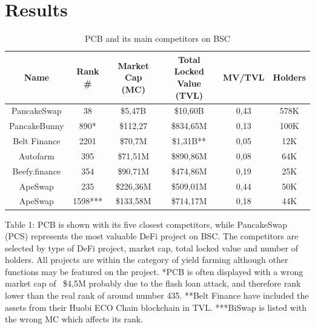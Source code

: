 \documentclass[12pt]{article}
\begin{document}
\section*{Results}
\begin{table}[ht]
\caption{PCB and its main competitors on BSC}
\begin{tabular}{||c c c c c c||} 
 \hline
 Name & Rank \# &  Market Cap (MC) & Total Locked Value (TVL) & MV/TVL & Holders \\ [0.5ex] 
 \hline\hline
 PancakeSwap & 38 & \$5,47B & \$10,60B & 0,43 & 578K \\ 
 \hline
 PancakeBunny & 890* & \$112,27 & \$834,65M & 0,13 & 100K \\
 \hline
 Belt Finance & 2201 & \$70,7M & \$1,31B** & 0,05 & 12K \\
 \hline
 Autofarm & 395 & \$71,51M & \$890,86M & 0,08 & 64K\\
 \hline
 Beefy.finance & 354 & \$90,71M & \$474,86M & 0,19 & 25K\\ 
 \hline
  ApeSwap & 235 & \$226,36M & \$509,01M & 0,44 & 50K\\ 
 \hline
  ApeSwap & 1598*** & \$133,58M & \$714,17M & 0,18 & 44K\\ [1ex] 
 \hline
\end{tabular}
\label{Table 1}

Table 1: PCB is shown with its five closest competitors, while PancakeSwap (PCS) represents the most valuable DeFi project on BSC. The competitors are selected by type of DeFi project, market cap, total locked value and number of holders. All projects are within the category of yield farming although other functions may be featured on the project. *PCB is often displayed with a wrong market cap of ~\$4,5M probably due to the flash loan attack, and therefore rank lower than the real rank of around number 435. **Belt Finance have included the assets from their Huobi ECO Chain blockchain in TVL. ***BiSwap is listed with the wrong MC which affects its rank.
\end{table}
\end{document}
